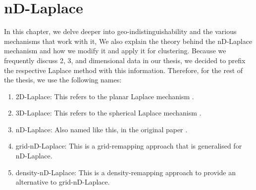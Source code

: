 \chapter{nD-Laplace}
In this chapter, we delve deeper into geo-indistinguishability and the various mechanisms that work with it, 
We also explain the theory behind the nD-Laplace mechanism and how we modify it and apply it for clustering.
Because we frequently discuss 2, 3, and dimensional data in our thesis, we decided to prefix the respective Laplace method with this information.
Therefore, for the rest of the thesis, we use the following names:
\begin{enumerate}
  \item 2D-Laplace: This refers to the planar Laplace mechanism \citep{DBLP:journals/corr/abs-1212-1984}.
  \item 3D-Laplace: This refers to the spherical Laplace mechanism \citep{9646489}.
  \item nD-Laplace: Also named like this, in the original paper \citep{fernandes_generalised_2019}.
  \item grid-nD-Laplace: This is a grid-remapping approach that is generalised for nD-Laplace.
  \item density-nD-Laplace: This is a density-remapping approach to provide an alternative to grid-nD-Laplace.
\end{enumerate}
\printnomenclature



\newpage
